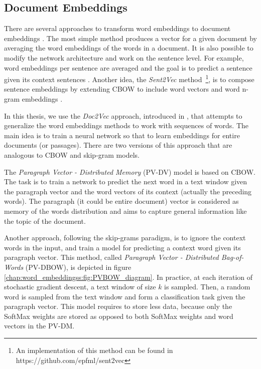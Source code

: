 \subsection{Document Embeddings} \label{chap:word_embeddings:sec:PVBOW} 
 
There are several approaches to transform word embeddings to document embeddings \parencite{mitra2018introduction,mikolov2013distributed}. The most simple method produces a vector for a given document by averaging the word embeddings of the words in a document. It is also possible to modify the network architecture and work on the sentence level. For example, word embeddings per sentence are averaged and the goal is to predict a sentence given its context sentences \parencite{kenter2016}. Another idea, the \textit{Sent2Vec} method~\footnote{An implementation of this method can be found in https://github.com/epfml/sent2vec}, is to compose sentence embeddings by extending CBOW to include word vectors and word n-gram embeddings \parencite{pagliardini-etal-2018-unsupervised}.

In this thesis, we use the \textit{Doc2Vec} approach, introduced in \parencite{le2014distributed}, that attempts to generalize the word embeddings methods to work with sequences of words. The main idea is to train a neural network so that to learn embeddings for entire documents (or passages). There are two versions of this approach that are analogous to CBOW and skip-gram models. 


The \textit{Paragraph Vector - Distributed Memory} (PV-DV) model is based on CBOW. The task is to train a network to predict the next word in a text window given the paragraph vector and the word vectors of its context (actually the preceding words). The paragraph (it could be entire document) vector is considered as memory of the words distribution and aims to capture general information like the topic of the document. 

Another approach, following the skip-grams paradigm, is to ignore the context words in the input, and train a model for predicting a context word given its paragraph vector. This method, called \textit{Paragraph Vector - Distributed Bag-of-Words} (PV-DBOW), is depicted in figure \ref{chap:word_embeddingss:fig:PVBOW_diagram}. In practice, at each iteration of stochastic gradient descent, a text window of size $k$ is sampled. Then, a random word is sampled from the text window and form a classification task given the paragraph vector. This model requires to store less data, because only the SoftMax weights are stored as opposed to both SoftMax weights and word vectors in the PV-DM. 

